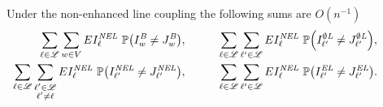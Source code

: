 \begin{lemma}
\label{nel-coupling-lem}
Under the non-enhanced line coupling the following sums are $O(n^{-1})$
\begin{align*}
\sum_{\Ln \in \lineset} \sum_{\vect{w}\in V} E\NEL_\Ln\ \prob{\left(\B_{\vect{w}} \neq \JB_{\vect{w}}\right)}, & \hspace{1cm} 
\sum_{\Ln \in \lineset} \sum_{\Ln' \in \lineset} E\NEL_\Ln\ \prob{\left(\OL_{\Ln'} \neq \JOL_{\Ln'}\right)},
\hspace{1cm}  \\
\sum_{\Ln \in \lineset} \sum_{\substack{\Ln' \in \lineset\\ \Ln'\neq \Ln}} E\NEL_\Ln\ \prob{\left(\NEL_{\Ln'}\neq \JNEL_{\Ln'}\right)}, &\hspace{1cm} 
\sum_{\Ln \in \lineset} \sum_{\Ln' \in \lineset} E\NEL_\Ln\ \prob{\left(\EL_{\Ln'} \neq \JEL_{\Ln'}\right)} .
\end{align*}
\end{lemma}
